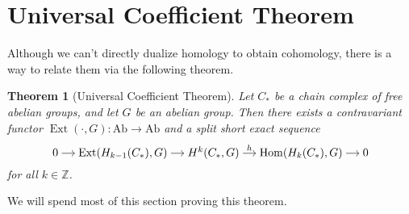 \documentclass{book}
\newcommand{\bbZ}{\mathbb{Z}}
\DeclareMathOperator{\Hom}{Hom}
\DeclareMathOperator{\Ext}{Ext}
\newtheorem{theorem}{Theorem}[section]
\theoremstyle{definition}
\theoremstyle{remark}
\numberwithin{equation}{section}
\begin{document}
\section{Universal Coefficient Theorem}
Although we can't directly dualize homology to obtain cohomology, there is a way to relate them via the following theorem.
\begin{theorem}[Universal Coefficient Theorem]
    Let $C_*$ be a chain complex of free abelian groups, and let $G$ be an abelian group. Then there exists a contravariant functor $\Ext(\cdot,G) \colon \mathrm{Ab} \to \mathrm{Ab}$ and a split short exact sequence 
    \begin{equation}
        \begin{tikzcd}[cramped,sep=small]
            0 \arrow[r] & \Ext(H_{k-1}(C_*),G) \arrow[r] & H^k(C_*,G) \arrow[r,"h"] & \Hom(H_k(C_*),G) \arrow[r] & 0
        \end{tikzcd}
    \end{equation}
    for all $k \in \bbZ$.
\end{theorem}
We will spend most of this section proving this theorem.
\end{document}
